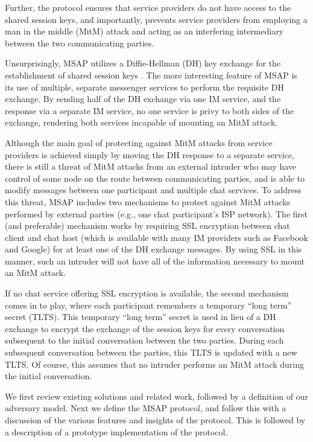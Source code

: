 \documentclass[twoside,10pt]{article}
\begin{document}
\begin{multicols}{2}
Further, the protocol ensures that service providers do not have access to the shared session keys, and importantly, prevents service providers from employing a man in the middle (MitM) attack and acting as an interfering intermediary between the two communicating parties.

Unsurprisingly, MSAP utilizes a Diffie-Hellman (DH) key exchange for the establishment of shared session keys \cite{diffie1976new}.  The more interesting feature of MSAP is its use of multiple, separate messenger services to perform the requisite DH exchange.  By sending half of the DH exchange via one IM service, and the response via a separate IM service, no one service is privy to both sides of the exchange, rendering both services incapable of mounting an MitM attack.

Although the main goal of protecting against MitM attacks from service providers is achieved simply by moving the DH response to a separate service, there is still a threat of MitM attacks from an external intruder who may have control of some node on the route between communicating parties, and is able to modify messages between one participant and multiple chat services. To address this threat, MSAP includes two mechanisms to protect against MitM attacks performed by external parties (e.g., one chat participant's ISP network).  The first (and preferable) mechanism works by requiring SSL encryption between chat client and chat host (which is available with many IM providers such as Facebook and Google) for at least one of the DH exchange messages.  By using SSL in this manner, such an intruder will not have all of the information necessary to mount an MitM attack.

If no chat service offering SSL encryption is available, the second mechanism comes in to play, where each participant remembers a temporary ``long term'' secret (TLTS).  This temporary ``long term'' secret is used in lieu of a DH exchange to encrypt the exchange of the session keys for every conversation subsequent to the initial conversation between the two parties.  During each subsequent conversation between the parties, this TLTS is updated with a new TLTS.  Of course, this assumes that no intruder performs an MitM attack during the initial conversation.

We first review existing solutions and related work, followed by a definition of our adversary model.  Next we define the MSAP protocol, and follow this with a discussion of the various features and insights of the protocol.  This is followed by a description of a prototype implementation of the protocol.


\end{multicols}
\end{document}
